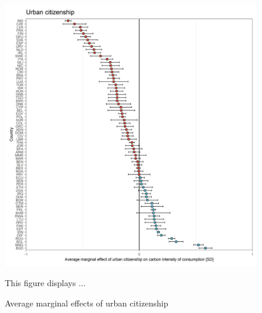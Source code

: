 \documentclass[12pt, a4paper]{article}
\newenvironment{subcaption}
{\strut
\vspace{-5pt}
\begin{minipage}[b]{0.9\textwidth}
  \hspace*{-\parindent}
  \footnotesize}
 {\end{minipage}}
\begin{document}
\begin{figure}[ht!]
  \centering
 \caption{Average marginal effects of urban citizenship} \label{fig:D5_Urban}
  \includegraphics{Analysis_OLS_ME_Carbon_Intensity/AME_OLS_CI_urban_01}
  \begin{subcaption}
    This figure displays ...
  \end{subcaption}

\end{figure}

\clearpage
\end{document}

